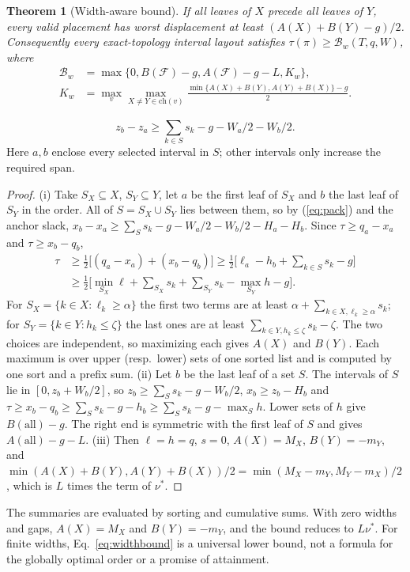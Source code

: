 \documentclass[preprint]{vgtc}   %
\newtheorem{theorem}{Theorem}\newtheorem{lemma}{Lemma}\newtheorem{proposition}{Proposition}
\begin{document}
\begin{theorem}[Width-aware bound]\label{thm:width}
If all leaves of $X$ precede all leaves of $Y$, every valid placement has worst displacement at least $(A(X)+B(Y)-g)/2$. Consequently every exact-topology interval layout satisfies $\tau(\pi)\ge\mathcal{B}_w(T,q,W)$, where
\begin{equation}\label{eq:widthbound}
\begin{aligned}
\mathcal{B}_w&=\max\{0,B(\mathcal{F})-g,A(\mathcal{F})-g-L,K_w\},\\
K_w&=\max_v\max_{X\ne Y\in\mathrm{ch}(v)}
 \frac{\min\{A(X)+B(Y),A(Y)+B(X)\}-g}{2}.
\end{aligned}
\end{equation}
\end{theorem}
\begin{equation}\label{eq:pack}
 z_b-z_a\ge\sum_{k\in S}s_k-g-W_a/2-W_b/2.
\end{equation}
Here $a,b$ enclose every selected interval in $S$; other intervals only increase the required span.
\begin{proof}
(i) Take $S_X\subseteq X$, $S_Y\subseteq Y$, let $a$ be the first leaf of $S_X$ and $b$ the last leaf of $S_Y$ in the order. All of $S=S_X\cup S_Y$ lies between them, so by (\ref{eq:pack}) and the anchor slack, $x_b-x_a\ge\sum_S s_k-g-W_a/2-W_b/2-H_a-H_b$. Since $\tau\ge q_a-x_a$ and $\tau\ge x_b-q_b$,
\begin{align*}
\tau&\ge\tfrac12\big[(q_a-x_a)+(x_b-q_b)\big]\ge\tfrac12\Big[\ell_a-h_b+\sum_{k\in S}s_k-g\Big]\\
&\ge\tfrac12\Big[\min_{S_X}\ell+\sum_{S_X}s_k+\sum_{S_Y}s_k-\max_{S_Y}h-g\Big].
\end{align*}
For $S_X=\{k\in X:\ell_k\ge\alpha\}$ the first two terms are at least $\alpha+\sum_{k\in X,\ell_k\ge\alpha}s_k$; for $S_Y=\{k\in Y:h_k\le\zeta\}$ the last ones are at least $\sum_{k\in Y,h_k\le\zeta}s_k-\zeta$. The two choices are independent, so maximizing each gives $A(X)$ and $B(Y)$. Each maximum is over upper (resp.\ lower) sets of one sorted list and is computed by one sort and a prefix sum.
(ii) Let $b$ be the last leaf of a set $S$. The intervals of $S$ lie in $[0,z_b+W_b/2]$, so $z_b\ge\sum_S s_k-g-W_b/2$, $x_b\ge z_b-H_b$ and $\tau\ge x_b-q_b\ge\sum_S s_k-g-h_b\ge\sum_S s_k-g-\max_S h$. Lower sets of $h$ give $B(\mathrm{all})-g$. The right end is symmetric with the first leaf of $S$ and gives $A(\mathrm{all})-g-L$.
(iii) Then $\ell=h=q$, $s=0$, $A(X)=M_X$, $B(Y)=-m_Y$, and $\min(A(X)+B(Y),A(Y)+B(X))/2=\min(M_X-m_Y,M_Y-m_X)/2$, which is $L$ times the term of $\nu^*$.
\end{proof}
The summaries are evaluated by sorting and cumulative sums. With zero widths and gaps, $A(X)=M_X$ and $B(Y)=-m_Y$, and the bound reduces to $L\nu^*$. For finite widths, Eq.~\ref{eq:widthbound} is a universal lower bound, not a formula for the globally optimal order or a promise of attainment.
\end{document}
